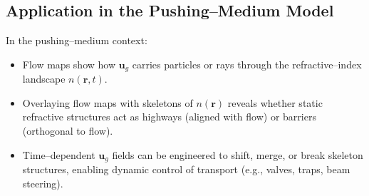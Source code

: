 \documentclass[10pt,a4paper]{article}
\begin{document}
\begin{multicols}{2}
\subsection*{Application in the Pushing--Medium Model}
In the pushing--medium context:
\begin{itemize}
    \item Flow maps show how $\mathbf{u}_g$ carries particles or rays through the refractive--index landscape $n(\mathbf{r},t)$.
    \item Overlaying flow maps with skeletons of $n(\mathbf{r})$ reveals whether static refractive structures act as highways (aligned with flow) or barriers (orthogonal to flow).
    \item Time--dependent $\mathbf{u}_g$ fields can be engineered to shift, merge, or break skeleton structures, enabling dynamic control of transport (e.g., valves, traps, beam steering).
\end{itemize}

\end{multicols}
\end{document}
